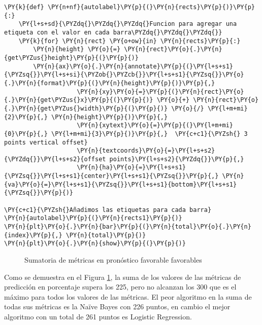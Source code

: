 \begin{tcolorbox}[breakable, size=fbox, boxrule=1pt, pad at break*=1mm,colback=cellbackground, colframe=cellborder]
\begin{Verbatim}[commandchars=\\\{\}]
\PY{k}{def} \PY{n+nf}{autolabel}\PY{p}{(}\PY{n}{rects}\PY{p}{)}\PY{p}{:}
    \PY{l+s+sd}{\PYZdq{}\PYZdq{}\PYZdq{}Funcion para agregar una etiqueta con el valor en cada barra\PYZdq{}\PYZdq{}\PYZdq{}}
    \PY{k}{for} \PY{n}{rect} \PY{o+ow}{in} \PY{n}{rects}\PY{p}{:}
        \PY{n}{height} \PY{o}{=} \PY{n}{rect}\PY{o}{.}\PY{n}{get\PYZus{}height}\PY{p}{(}\PY{p}{)}
        \PY{n}{ax}\PY{o}{.}\PY{n}{annotate}\PY{p}{(}\PY{l+s+s1}{\PYZsq{}}\PY{l+s+si}{\PYZob{}\PYZcb{}}\PY{l+s+s1}{\PYZsq{}}\PY{o}{.}\PY{n}{format}\PY{p}{(}\PY{n}{height}\PY{p}{)}\PY{p}{,}
                    \PY{n}{xy}\PY{o}{=}\PY{p}{(}\PY{n}{rect}\PY{o}{.}\PY{n}{get\PYZus{}x}\PY{p}{(}\PY{p}{)} \PY{o}{+} \PY{n}{rect}\PY{o}{.}\PY{n}{get\PYZus{}width}\PY{p}{(}\PY{p}{)} \PY{o}{/} \PY{l+m+mi}{2}\PY{p}{,} \PY{n}{height}\PY{p}{)}\PY{p}{,}
                    \PY{n}{xytext}\PY{o}{=}\PY{p}{(}\PY{l+m+mi}{0}\PY{p}{,} \PY{l+m+mi}{3}\PY{p}{)}\PY{p}{,}  \PY{c+c1}{\PYZsh{} 3 points vertical offset}
                    \PY{n}{textcoords}\PY{o}{=}\PY{l+s+s2}{\PYZdq{}}\PY{l+s+s2}{offset points}\PY{l+s+s2}{\PYZdq{}}\PY{p}{,}
                    \PY{n}{ha}\PY{o}{=}\PY{l+s+s1}{\PYZsq{}}\PY{l+s+s1}{center}\PY{l+s+s1}{\PYZsq{}}\PY{p}{,} \PY{n}{va}\PY{o}{=}\PY{l+s+s1}{\PYZsq{}}\PY{l+s+s1}{bottom}\PY{l+s+s1}{\PYZsq{}}\PY{p}{)}

\PY{c+c1}{\PYZsh{}Añadimos las etiquetas para cada barra}
\PY{n}{autolabel}\PY{p}{(}\PY{n}{rects1}\PY{p}{)}
\PY{n}{plt}\PY{o}{.}\PY{n}{bar}\PY{p}{(}\PY{n}{total}\PY{o}{.}\PY{n}{index}\PY{p}{,} \PY{n}{total}\PY{p}{)}
\PY{n}{plt}\PY{o}{.}\PY{n}{show}\PY{p}{(}\PY{p}{)}
\end{Verbatim}
\end{tcolorbox}

\begin{center}
    	\begin{figure}[H]
	\centering
	\caption{Sumatoria de métricas en pronóstico favorable favorables}
	\label{fig:smpf}
	\end{figure}
\end{center}
    
    Como se demuestra en el Figura \ref{fig:smpf}, la suma de los valores de las métricas de predicción en porcentaje supera los 225, pero no alcanzan los 300 que es el máximo para todos los valores de las métricas. El peor algoritmo en la suma de todas sus métricas es la Naïve Bayes con 226 puntos, en cambio el mejor algoritmo con un total de 261 puntos es Logistic Regression.

